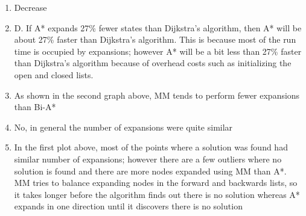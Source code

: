 \documentclass[8pt, letterpaper, titlepage]{article}
\begin{document}
\begin{enumerate}
  \item Decrease
  \item D. If A* expands 27\% fewer states than Dijkstra's algorithm, then A* will be about 27\% faster than Dijkstra's algorithm. This is because most of the run time is occupied by expansions; however A* will be a bit less than 27\% faster than Dijkstra's algorithm because of overhead costs such as initializing the open and closed lists. 
  \item As shown in the second graph above, MM tends to perform fewer expansions than Bi-A*
  \item No, in general the number of expansions were quite similar
  \item In the first plot above, most of the points where a solution was found had similar number of expansions; however there are a few outliers where no solution is found and there are more nodes expanded using MM than A*. MM tries to balance expanding nodes in the forward and backwards lists, so it takes longer before the algorithm finds out there is no solution whereas A* expands in one direction until it discovers there is no solution
\end{enumerate}
\end{document}
